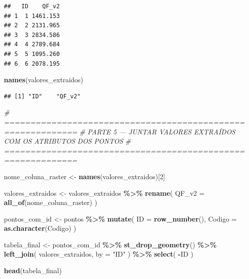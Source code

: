 \documentclass[
]{article}
\newenvironment{Shaded}{\begin{snugshade}}{\end{snugshade}}
\newcommand{\AttributeTok}[1]{\textcolor[rgb]{0.13,0.29,0.53}{#1}}
\newcommand{\CommentTok}[1]{\textcolor[rgb]{0.56,0.35,0.01}{\textit{#1}}}
\newcommand{\DecValTok}[1]{\textcolor[rgb]{0.00,0.00,0.81}{#1}}
\newcommand{\FunctionTok}[1]{\textcolor[rgb]{0.13,0.29,0.53}{\textbf{#1}}}
\newcommand{\NormalTok}[1]{#1}
\newcommand{\OtherTok}[1]{\textcolor[rgb]{0.56,0.35,0.01}{#1}}
\newcommand{\SpecialCharTok}[1]{\textcolor[rgb]{0.81,0.36,0.00}{\textbf{#1}}}
\newcommand{\StringTok}[1]{\textcolor[rgb]{0.31,0.60,0.02}{#1}}
\begin{document}
\begin{verbatim}
##   ID    QF_v2
## 1  1 1461.153
## 2  2 2131.965
## 3  3 2834.586
## 4  4 2789.684
## 5  5 1095.260
## 6  6 2078.195
\end{verbatim}

\begin{Shaded}
\begin{Highlighting}[]
\FunctionTok{names}\NormalTok{(valores\_extraidos)}
\end{Highlighting}
\end{Shaded}

\begin{verbatim}
## [1] "ID"    "QF_v2"
\end{verbatim}

\begin{Shaded}
\begin{Highlighting}[]
\CommentTok{\# ============================================================}
\CommentTok{\# PARTE 5 — JUNTAR VALORES EXTRAÍDOS COM OS ATRIBUTOS DOS PONTOS}
\CommentTok{\# ============================================================}

\NormalTok{nome\_coluna\_raster }\OtherTok{\textless{}{-}} \FunctionTok{names}\NormalTok{(valores\_extraidos)[}\DecValTok{2}\NormalTok{]}

\NormalTok{valores\_extraidos }\OtherTok{\textless{}{-}}\NormalTok{ valores\_extraidos }\SpecialCharTok{\%\textgreater{}\%}
  \FunctionTok{rename}\NormalTok{(}
    \AttributeTok{QF\_v2 =} \FunctionTok{all\_of}\NormalTok{(nome\_coluna\_raster)}
\NormalTok{  )}

\NormalTok{pontos\_com\_id }\OtherTok{\textless{}{-}}\NormalTok{ pontos }\SpecialCharTok{\%\textgreater{}\%}
  \FunctionTok{mutate}\NormalTok{(}
    \AttributeTok{ID =} \FunctionTok{row\_number}\NormalTok{(),}
    \AttributeTok{Codigo =} \FunctionTok{as.character}\NormalTok{(Codigo)}
\NormalTok{  )}

\NormalTok{tabela\_final }\OtherTok{\textless{}{-}}\NormalTok{ pontos\_com\_id }\SpecialCharTok{\%\textgreater{}\%}
  \FunctionTok{st\_drop\_geometry}\NormalTok{() }\SpecialCharTok{\%\textgreater{}\%}
  \FunctionTok{left\_join}\NormalTok{(}
\NormalTok{    valores\_extraidos,}
    \AttributeTok{by =} \StringTok{"ID"}
\NormalTok{  ) }\SpecialCharTok{\%\textgreater{}\%}
  \FunctionTok{select}\NormalTok{(}
    \SpecialCharTok{{-}}\NormalTok{ID}
\NormalTok{  )}

\FunctionTok{head}\NormalTok{(tabela\_final)}
\end{Highlighting}
\end{Shaded}
\end{document}

